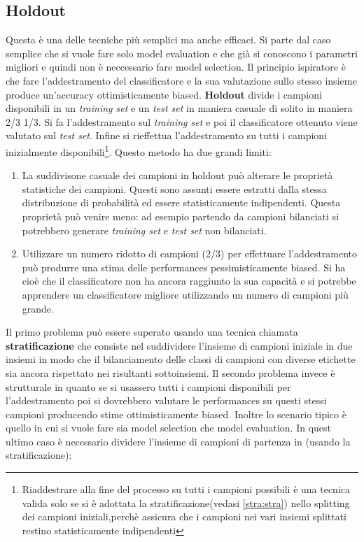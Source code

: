 \subsection{Holdout}
Questa è una delle tecniche più semplici ma anche efficaci. Si parte dal caso semplice che si vuole fare solo model evaluation e che già si conoscono i parametri migliori e quindi non è neccessario fare model selection. Il principio ispiratore è che fare l'addestramento del classificatore e la sua valutazione sullo stesso insieme produce un'accuracy ottimisticamente biased. \textbf{Holdout} divide i campioni disponibili in un \textit{training set} e un \textit{test set} in maniera casuale di solito in maniera 2/3 1/3. Si fa l'addestramento sul \textit{training set} e poi il classificatore ottenuto viene valutato sul \textit{test set}. Infine si rieffettua l'addestramento su tutti i campioni inizialmente disponibili\footnote{Riaddestrare alla fine del processo su tutti i campioni possibili è una tecnica valida solo se si è adottata la stratificazione(vedasi \ref{stra:stra}) nello splitting dei campioni iniziali,perchè assicura che i campioni nei vari insiemi splittati restino statisticamente indipendenti}. Questo metodo ha due grandi limiti:
\begin{enumerate}
\item La suddivisone casuale dei campioni in holdout può alterare le proprietà statistiche dei campioni. Questi sono assunti essere estratti dalla stessa distribuzione di probabilità ed essere statisticamente indipendenti. Questa proprietà può venire meno: ad esempio partendo da campioni bilanciati si potrebbero generare \textit{training set} e \textit{test set} non bilanciati.
\item \label{item:holdlim} Utilizzare un numero ridotto di campioni (2/3) per effettuare l'addestramento può produrre una stima delle performances pessimisticamente biased. Si ha cioè che il classificatore non ha ancora raggiunto la sua capacità e si potrebbe apprendere un classificatore migliore utilizzando un numero di campioni più grande. 
\end{enumerate}
Il primo problema può essere superato usando una tecnica chiamata
\label{stra:stra} \textbf{stratificazione} che consiste nel suddividere l'insieme di campioni iniziale in due insiemi in modo che il bilanciamento delle classi di campioni con diverse etichette sia ancora rispettato nei risultanti sottoinsiemi. Il secondo problema invece è strutturale in quanto se si usassero tutti i campioni disponibili per l'addestramento poi si dovrebbero valutare le performances su questi stessi campioni producendo stime ottimisticamente biased. Inoltre lo scenario tipico è quello in cui si vuole fare sia model selection che model evaluation. In quest ultimo caso è necessario dividere l'insieme di campioni di partenza in (usando la stratificazione):
